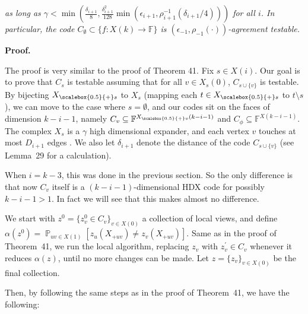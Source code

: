 \emph{as long as $\gamma<\min\left(\frac{\delta_{i+1}}{8},\frac{\delta_{i+1}^{2}}{128}\min\left(\epsilon_{i+1},\rho_{i+1}^{-1}(\delta_{i+1}/4)\right)\right)$ for all $i$.
In particular, the code $C_{\emptyset}\subset\{f:X(k)\to\mathbb{F}\}$ is $(\epsilon_{-1},\rho_{-1}(\cdot))$-agreement testable.}\par






\par\medskip\noindent\textbf{Proof.}\par




The proof is very similar to the proof of Theorem 41. Fix $s\in X(i)$. Our goal is to prove that $C_{s}$ is testable assuming that for all $v\in X_{s}(0)$, $C_{s\cup\{v\}}$ is testable. By bijecting ${X}_{\scalebox{0.5}{+}s}$ to $X_{s}$ (mapping each $t\in{X}_{\scalebox{0.5}{+}s}$ to $t\setminus s$), we can move to the case where $s=\emptyset$, and our codes sit on the faces of dimension $k-i-1$, namely $C_{v}\subseteq\mathbb{F}^{{X}_{\scalebox{0.5}{+}v}(k-i-1)}$ and $C_{\phi}\subseteq\mathbb{F}^{X(k-i-1)}$. The complex $X_{s}$ is a $\gamma$ high dimensional expander, and each vertex $v$ touches at most $D_{i+1}$ edges . We also let $\delta_{i+1}$ denote the distance of the code $C_{s\cup\{v\}}$ (see Lemma 29 for a calculation).\par




When $i=k-3$, this was done in the previous section. So the only difference is that now $C_{v}$ itself is a $(k-i-1)$-dimensional HDX code for possibly $k-i-1>1$. In fact we will see that this makes almost no difference.\par




We start with $z^{0}=\{z^{0}_{v}\in C_{v}\}_{v\in X(0)}$ a collection of local views, and define $\alpha(z^{0})=\operatorname*{\mathbb{P}}_{uv\in X(1)}[z_{u}(X_{+uv})\not=z_{v}(X_{+uv})]$. Same as in the proof of Theorem 41, we run the local algorithm, replacing $z_{v}$ with $z^{\prime}_{v}\in C_{v}$ whenever it reduces $\alpha(z)$, until no more changes can be made. Let $z=\{z_{v}\}_{v\in X(0)}$ be the final collection.\par




Then, by following the same steps as in the proof of Theorem 41, we have the following:\par



